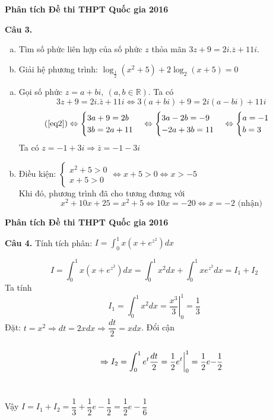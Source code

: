 \documentclass[handout]{beamer} %
\newcommand{\cau}[2]{\begin{block}{}
		{\color{red}\textbf{Câu #1.}} #2
	\end{block}
}
\begin{document}
\begin{frame}{\textbf{\qquad Phân tích Đề thi THPT Quốc gia 2016}}
	\cau{3}{\begin{enumerate}[a)]
			\item Tìm số phức liên hợp của số phức $z$ thỏa mãn $3z+9=2i.\overline{z}+11i$.
			\item Giải hệ phương trình: $\log_{\frac{1}{2}} (x^2+5)+2\log_2(x+5)=0$
		\end{enumerate}}
		\begin{enumerate}[a)]
			\item Gọi số phức 
			$z=a+bi,~(a,b\in\mathbb{R})$. Ta có
			\begin{equation}\label{eq2}
				3z+9=2i.\bar{z}+11i\Leftrightarrow 3(a+bi)+9=2i(a-bi)+11i
			\end{equation}
			$$
			(\ref{eq2})\Leftrightarrow \begin{cases}
			3a+9=2b\\
			3b=2a+11
			\end{cases}\Leftrightarrow 
			\begin{cases}
			3a-2b=-9\\
			-2a+3b=11
			\end{cases}\Leftrightarrow\begin{cases}
			a=-1\\
			b=3
			\end{cases}
			$$
			Ta có $z=-1+3i\Rightarrow \bar{z}=-1-3i$
			\item  Điều kiện: $\begin{cases}
			x^2+5>0\\
			x+5>0
			\end{cases}\Leftrightarrow x+5>0\Leftrightarrow x>-5$\\
			Khi đó, phương trình đã cho tương đương với
			$$x^2+10x+25=x^2+5\Leftrightarrow 10x=-20\Leftrightarrow x=-2 \mbox{ (nhận)}$$
		\end{enumerate}
	\end{frame}
	
	\begin{frame}{\textbf{\qquad Phân tích Đề thi THPT Quốc gia 2016}}
		\cau{4}{Tính tích phân: $I=\int_{0}^{1} x\left(x+e^{z^2}\right)dx$}
		$$I=\int_{0}^{1} x\left(x+e^{z^2}\right)dx=\int_{0}^{1} x^2 dx+\int_{0}^{1}xe^{z^2}dx=I_1+I_2
		$$
		Ta tính
		$$I_1=\int_{0}^{1} x^2dx= \left.\frac{x^3}{3}\right|_0^1=\frac{1}{3}$$
		Đặt: $t=x^2\Rightarrow dt=2xdx\Rightarrow \dfrac{dt}{2}=xdx$. Đổi cận\\[-15pt]
		$$\begin{tabular}{cc}
		& \raisebox{-0.25cm}{\parbox[b]{5cm}{$$\Rightarrow I_2=\int_0^1 e^t\frac{dt}{2}=\frac{1}{2}\bigg.e^t\bigg|_0^1=\frac{1}{2}e-\frac{1}{2}$$}}
		\end{tabular}$$~\\[-10pt]
		Vậy $I=I_1+I_2=\dfrac{1}{3}+\dfrac{1}{2}e-\dfrac{1}{2}=\dfrac{1}{2}e-\dfrac{1}{6}$
	\end{frame}
	
\end{document}
